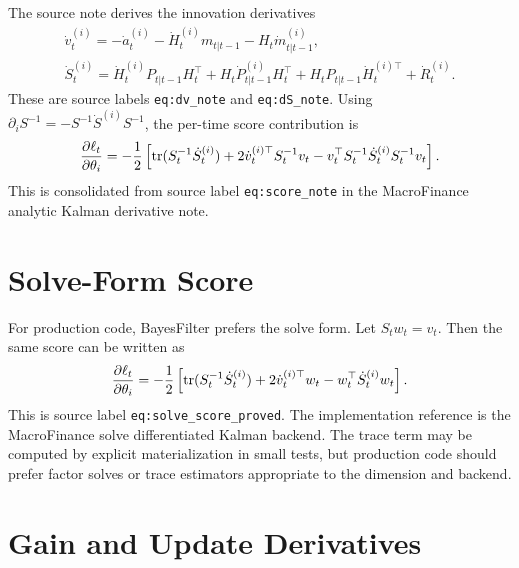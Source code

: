 The source note derives the innovation derivatives
\begin{align}
\label{eq:bf-score-innovation-first}
  \dot v_t^{(i)}
  =
  -\dot a_t^{(i)}
  -\dot H_t^{(i)}m_{t|t-1}
  -H_t\dot m_{t|t-1}^{(i)},\\
\label{eq:bf-score-innovation-cov-first}
  \dot S_t^{(i)}
  =
  \dot H_t^{(i)}P_{t|t-1}H_t^\top
  +H_t\dot P_{t|t-1}^{(i)}H_t^\top
  +H_tP_{t|t-1}\dot H_t^{(i)\top}
  +\dot R_t^{(i)}.
\end{align}
These are source labels \texttt{eq:dv\_note} and \texttt{eq:dS\_note}.
Using $\partial_i S^{-1}=-S^{-1}\dot S^{(i)}S^{-1}$, the per-time score
contribution is
\begin{equation}
\label{eq:bf-kalman-score-contribution}
  \frac{\partial \ell_t}{\partial \theta_i}
  =
  -\frac{1}{2}
  \left[
    \operatorname{tr}(S_t^{-1}\dot S_t^{(i)})
    +2\dot v_t^{(i)\top}S_t^{-1}v_t
    -v_t^\top S_t^{-1}\dot S_t^{(i)}S_t^{-1}v_t
  \right].
\end{equation}
This is consolidated from source label \texttt{eq:score\_note} in the
MacroFinance analytic Kalman derivative note.

\section{Solve-Form Score}
\label{sec:bf-solve-form-score}

For production code, BayesFilter prefers the solve form.  Let $S_tw_t=v_t$.
Then the same score can be written as
\begin{equation}
\label{eq:bf-solve-score}
  \frac{\partial \ell_t}{\partial \theta_i}
  =
  -\frac{1}{2}
  \left[
    \operatorname{tr}(S_t^{-1}\dot S_t^{(i)})
    +2\dot v_t^{(i)\top}w_t
    -w_t^\top\dot S_t^{(i)}w_t
  \right].
\end{equation}
This is source label \texttt{eq:solve\_score\_proved}.  The implementation
reference is the MacroFinance solve differentiated Kalman backend.  The trace
term may be computed by explicit materialization in small tests, but production
code should prefer factor solves or trace estimators appropriate to the
dimension and backend.

\section{Gain and Update Derivatives}
\label{sec:bf-score-update-derivatives}

